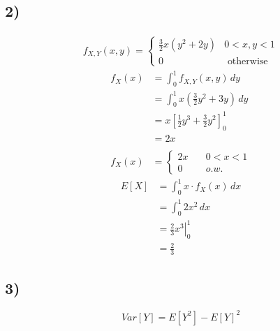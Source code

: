 \documentclass[11pt]{article}
\begin{document}
    \subsection*{2)}
    \begin{align*}
        f_{X,Y}(x, y) = \left\{ \begin{array}{cc} \frac{3}{2}x(y^2 + 2y) & 0 < x, y < 1 \\ 0 & \textrm{ otherwise} \end{array} \right.
    \end{align*}
    \begin{align*}
        f_{X}\left( x\right) &= \int _{0}^{1} f_{X,Y} (x,y) \,dy \\ 
        &= \int _{0}^{1} x\left(\frac{3}{2}y^2 + 3y\right) \,dy \\
        &= x \left[ \frac{1}{2}y^3 + \frac{3}{2} y^2 \right]^{1}_{0} \\
        &= 2x \\ \\ 
        f_X(x) &= \begin{cases}
            2x \quad & 0 < x < 1 \\ 
            0 \quad & o.w.
        \end{cases} 
    \end{align*}
    \begin{align*}
        E[X] &= \int_{0}^{1} x \cdot f_X(x) \,dx \\
        &= \int_{0}^{1} 2x^2 \,dx \\ 
        &= \left.\frac{2}{3}x^3\right|_0^1 \\
        &= \frac{2}{3}
    \end{align*}

    \subsection*{3)}
    $$Var[Y] = E[Y^2] - E[Y]^2$$
\end{document}
